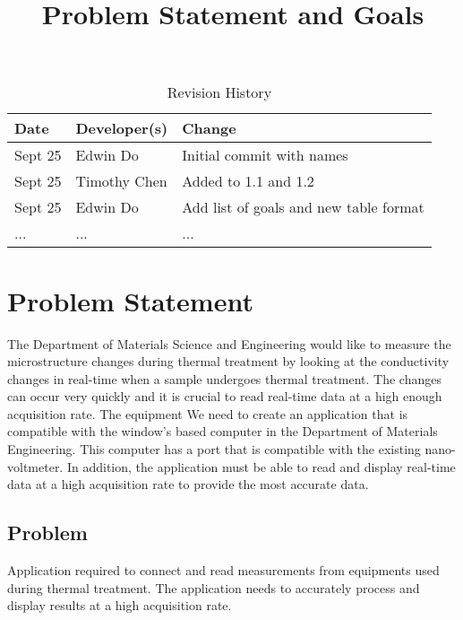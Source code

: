 \documentclass[12pt, titlepage]{article}
\title{Problem Statement and Goals\\\progname}
\author{\authname}
\date{}
\begin{document}
\maketitle

\begin{table}[hp]
\caption{Revision History} \label{TblRevisionHistory}
\begin{tabularx}{\textwidth}{llX}
\toprule
\textbf{Date} & \textbf{Developer(s)} & \textbf{Change}\\
\midrule
Sept 25 & Edwin Do & Initial commit with names\\
Sept 25 & Timothy Chen & Added to 1.1 and 1.2 \\
Sept 25 & Edwin Do & Add list of goals and new table format\\
... & ... & ...\\
\bottomrule
\end{tabularx}
\end{table}

\section{Problem Statement}
The Department of Materials Science and Engineering would like to measure the microstructure changes
during thermal treatment by looking at the conductivity changes in real-time when a sample undergoes 
thermal treatment. The changes can occur very quickly and it is crucial to read real-time data at a high enough acquisition rate.
The equipment 
We need to create an application that is compatible with the window's based computer in the Department of Materials Engineering.
This computer has a
port that is compatible with the existing nano-voltmeter. 
In addition, the application must be able to read and display real-time data at a high acquisition rate to provide the most accurate data.



\subsection{Problem}
Application required to connect and read measurements from equipments used during thermal treatment.
The application needs to accurately process and display results at a high acquisition rate.
\end{document}
